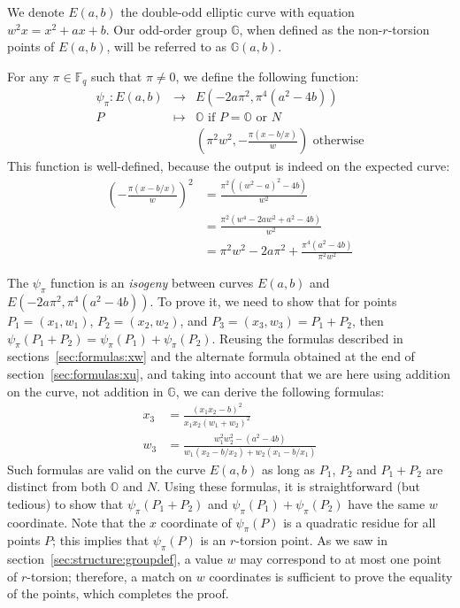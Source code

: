 \documentclass{llncs}
\newcommand{\bF}{\mathbb{F}}
\newcommand{\bG}{\mathbb{G}}
\newcommand{\neutral}{\mathbb{O}}
\begin{document}
We denote $E(a, b)$ the double-odd elliptic curve with equation $w^2 x =
x^2 + ax + b$. Our odd-order group $\bG$, when defined as the
non-$r$-torsion points of $E(a, b)$, will be referred to as $\bG(a, b)$.

For any $\pi \in \bF_q$ such that $\pi \neq 0$, we define the following
function:
\begin{eqnarray*}
    \psi_\pi : E(a, b) &\longrightarrow& E(-2a\pi^2, \pi^4(a^2-4b)) \\
    P &\longmapsto& \neutral \text{\ \ if\ } P = \neutral \text{\ or\ } N \\
    & & \left(\pi^2 w^2, -\frac{\pi (x - b/x)}{w}\right) \text{\ \ otherwise}
\end{eqnarray*}
This function is well-defined, because the output is indeed on the
expected curve:
\begin{align*}
    \left(-\frac{\pi(x - b/x)}{w}\right)^2
    &= \frac{\pi^2 ((w^2 - a)^2 - 4b)}{w^2} \\
    &= \frac{\pi^2 (w^4 - 2aw^2 + a^2 - 4b)}{w^2} \\
    &= \pi^2 w^2 - 2a\pi^2 + \frac{\pi^4 (a^2-4b)}{\pi^2 w^2}
\end{align*}

The $\psi_\pi$ function is an \emph{isogeny} between curves $E(a, b)$
and $E(-2a\pi^2, \pi^4(a^2-4b))$. To prove it, we need to show that for
points $P_1 = (x_1, w_1)$, $P_2 = (x_2, w_2)$, and $P_3 = (x_3, w_3) =
P_1 + P_2$, then $\psi_\pi(P_1 + P_2) = \psi_\pi(P_1) + \psi_\pi(P_2)$.
Reusing the formulas described in sections~\ref{sec:formulas:xw} and
the alternate formula obtained at the end of section~\ref{sec:formulas:xu},
and taking into account that we are here using addition on the curve,
not addition in $\bG$, we can derive the following formulas:
\begin{align*}
    x_3 &= \frac{(x_1 x_2 - b)^2}{x_1 x_2 (w_1 + w_2)^2} \\
    w_3 &= \frac{w_1^2 w_2^2 - (a^2-4b)}{w_1(x_2 - b/x_2) + w_2(x_1 - b/x_1)}
\end{align*}
Such formulas are valid on the curve $E(a, b)$ as long as $P_1$, $P_2$
and $P_1 + P_2$ are distinct from both $\neutral$ and $N$. Using these
formulas, it is straightforward (but tedious) to show that $\psi_\pi(P_1
+ P_2)$ and $\psi_\pi(P_1) + \psi_\pi(P_2)$ have the same $w$
coordinate. Note that the $x$ coordinate of $\psi_\pi(P)$ is a quadratic
residue for all points $P$; this implies that $\psi_\pi(P)$ is an
$r$-torsion point. As we saw in section~\ref{sec:structure:groupdef}, a
value $w$ may correspond to at most one point of $r$-torsion; therefore,
a match on $w$ coordinates is sufficient to prove the equality of the
points, which completes the proof.
\end{document}

